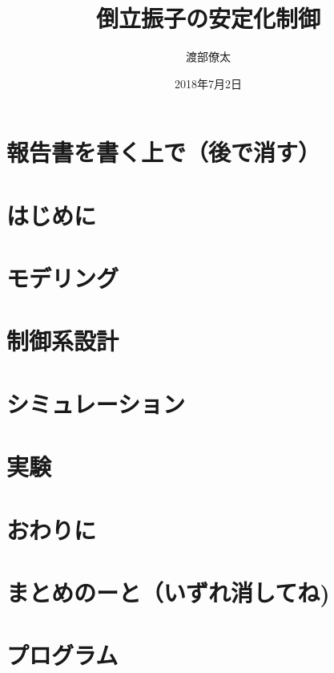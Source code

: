 \documentclass[a4j , 11pt , twoside]{jbook}
\begin{document}
\title{倒立振子の安定化制御}
\author{渡部僚太}
\date{2018年7月2日}
\maketitle
\tableofcontents %
\listoffigures %
\listoftables %
\cleardoublepage %
\chapter{報告書を書く上で（後で消す）}
	
\chapter{はじめに}
	
\chapter{モデリング}
	
\chapter{制御系設計}
	
\chapter{シミュレーション}
	
\chapter{実験}
	
\chapter{おわりに}
	
\chapter{まとめのーと（いずれ消してね)}
	
%
%
\appendix
\chapter{プログラム}
	
\end{document}

